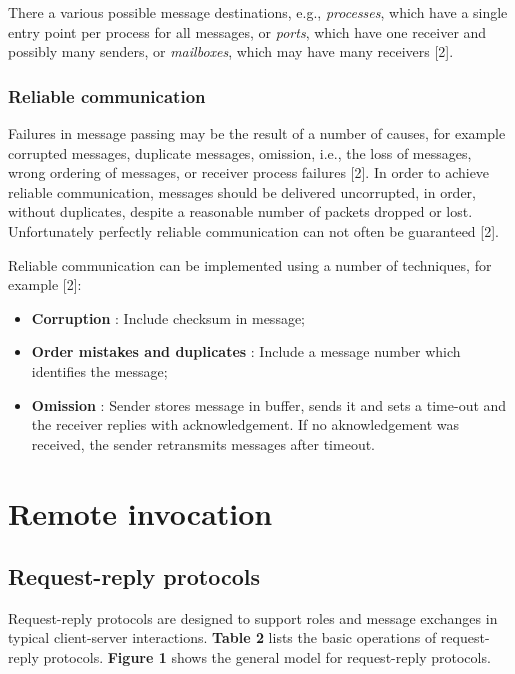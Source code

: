 There a various possible message destinations, e.g., \emph{processes}, which have a single entry point per process for all messages, or \emph{ports}, which have one receiver and possibly many senders, or \emph{mailboxes}, which may have many receivers [2].


\subsubsection{Reliable communication}

Failures in message passing may be the result of a number of causes, for example corrupted messages, duplicate messages, omission, i.e., the loss of messages, wrong ordering of messages, or receiver process failures [2]. In order to achieve reliable communication, messages should be delivered uncorrupted, in order, without duplicates, despite a reasonable number of packets dropped or lost. Unfortunately perfectly reliable communication can not often be guaranteed [2].

Reliable communication can be implemented using a number of techniques, for example [2]:
\begin{itemize}
	\item \textbf{Corruption} : Include checksum in message;
	\item \textbf{Order mistakes and duplicates} : Include a message number which identifies the message;
	\item \textbf{Omission} : Sender stores message in buffer, sends it and sets a time-out and the receiver replies with acknowledgement. If no aknowledgement was received, the sender retransmits messages after timeout.
\end{itemize}



\section{Remote invocation}

\subsection{Request-reply protocols}

Request-reply protocols are designed to support roles and message exchanges in typical client-server interactions. \textbf{Table 2} lists the basic operations of request-reply protocols. \textbf{Figure 1} shows the general model for request-reply protocols.


